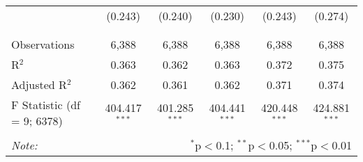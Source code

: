 \begin{table}[!htbp]
\begin{tabular}{@{\extracolsep{5pt}}lccccc}
  & (0.243) & (0.240) & (0.230) & (0.243) & (0.274) \\ 
  & & & & & \\ 
\hline \\[-1.8ex] 
Observations & 6,388 & 6,388 & 6,388 & 6,388 & 6,388 \\ 
R$^{2}$ & 0.363 & 0.362 & 0.363 & 0.372 & 0.375 \\ 
Adjusted R$^{2}$ & 0.362 & 0.361 & 0.362 & 0.371 & 0.374 \\ 
F Statistic (df = 9; 6378) & 404.417$^{***}$ & 401.285$^{***}$ & 404.441$^{***}$ & 420.448$^{***}$ & 424.881$^{***}$ \\ 
\hline 
\hline \\[-1.8ex] 
\textit{Note:}  & \multicolumn{5}{r}{$^{*}$p$<$0.1; $^{**}$p$<$0.05; $^{***}$p$<$0.01} \\ 
\end{tabular} 
\end{table} 
